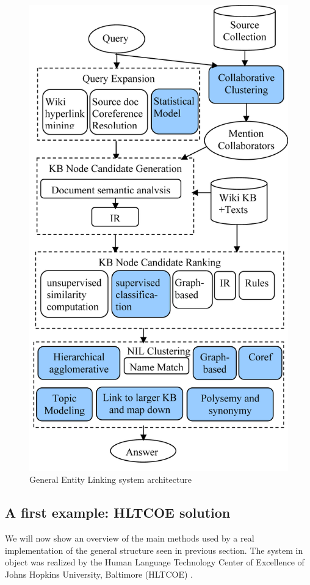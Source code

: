 \documentclass[a4paper,11pt]{report}
\begin{document}
\begin{figure}[htbp] 
\centering
\includegraphics[]{el_architecture}
\caption{General Entity Linking system architecture}
\label{fig:el_arch}
\end{figure}

\subsection{A first example: HLTCOE solution}
\label{sec:hltcoe}
We will now show an overview of the main methods used by a real implementation of the general structure seen in previous section. The system in object was realized by the Human Language Technology Center of Excellence of Johns Hopkins University, Baltimore (HLTCOE) \cite{2010hltcoe}.
\end{document}
